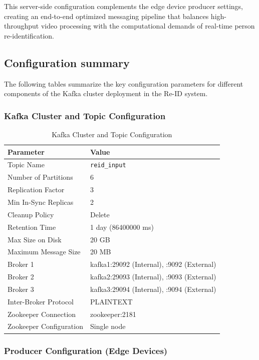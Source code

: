 This server-side configuration complements the edge device producer settings, creating an end-to-end optimized messaging pipeline that balances high-throughput video processing with the computational demands of real-time person re-identification.

\subsection{Configuration summary}

The following tables summarize the key configuration parameters for different components of the Kafka cluster deployment in the Re-ID system.

\subsubsection{Kafka Cluster and Topic Configuration}

\begin{table}[htbp]
\centering
\caption{Kafka Cluster and Topic Configuration}
\label{tab:kafka_cluster_config}
\begin{tabular}{|p{4cm}|p{8cm}|}
\hline
\textbf{Parameter} & \textbf{Value} \\
\hline
Topic Name & \texttt{reid\_input} \\
Number of Partitions & 6 \\
Replication Factor & 3 \\
Min In-Sync Replicas & 2 \\
Cleanup Policy & Delete \\
Retention Time & 1 day (86400000 ms) \\
Max Size on Disk & 20 GB \\
Maximum Message Size & 20 MB \\
\hline
Broker 1 & kafka1:29092 (Internal), :9092 (External) \\
Broker 2 & kafka2:29093 (Internal), :9093 (External) \\
Broker 3 & kafka3:29094 (Internal), :9094 (External) \\
Inter-Broker Protocol & PLAINTEXT \\
\hline
Zookeeper Connection & zookeeper:2181 \\
Zookeeper Configuration & Single node \\
\hline
\end{tabular}
\end{table}

\subsubsection{Producer Configuration (Edge Devices)}

